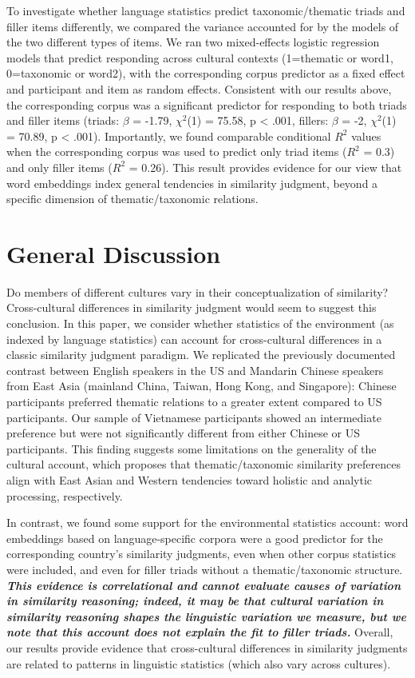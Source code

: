 \documentclass[10pt, letterpaper]{article}
\begin{document}
To investigate whether language statistics predict taxonomic/thematic
triads and filler items differently, we compared the variance accounted
for by the models of the two different types of items. We ran two
mixed-effects logistic regression models that predict responding across
cultural contexts (1=thematic or word1, 0=taxonomic or word2), with the
corresponding corpus predictor as a fixed effect and participant and
item as random effects. Consistent with our results above, the
corresponding corpus was a significant predictor for responding to both
triads and filler items (triads: \(\beta\) = -1.79, \(\chi^2\)(1) =
75.58, p \textless{} .001, fillers: \(\beta\) = -2, \(\chi^2\)(1) =
70.89, p \textless{} .001). Importantly, we found comparable conditional
\(R^2\) values when the corresponding corpus was used to predict only
triad items (\(R^2\) = 0.3) and only filler items (\(R^2\) = 0.26). This
result provides evidence for our view that word embeddings index general
tendencies in similarity judgment, beyond a specific dimension of
thematic/taxonomic relations.

\hypertarget{general-discussion}{%
\section{General Discussion}\label{general-discussion}}

Do members of different cultures vary in their conceptualization of
similarity? Cross-cultural differences in similarity judgment would seem
to suggest this conclusion. In this paper, we consider whether
statistics of the environment (as indexed by language statistics) can
account for cross-cultural differences in a classic similarity judgment
paradigm. We replicated the previously documented contrast between
English speakers in the US and Mandarin Chinese speakers from East Asia
(mainland China, Taiwan, Hong Kong, and Singapore): Chinese participants
preferred thematic relations to a greater extent compared to US
participants. Our sample of Vietnamese participants showed an
intermediate preference but were not significantly different from either
Chinese or US participants. This finding suggests some limitations on
the generality of the cultural account, which proposes that
thematic/taxonomic similarity preferences align with East Asian and
Western tendencies toward holistic and analytic processing,
respectively.

In contrast, we found some support for the environmental statistics
account: word embeddings based on language-specific corpora were a good
predictor for the corresponding country's similarity judgments, even
when other corpus statistics were included, and even for filler triads
without a thematic/taxonomic structure. \textbf{\emph{This evidence is
correlational and cannot evaluate causes of variation in similarity
reasoning; indeed, it may be that cultural variation in similarity
reasoning shapes the linguistic variation we measure, but we note that
this account does not explain the fit to filler triads.}} Overall, our
results provide evidence that cross-cultural differences in similarity
judgments are related to patterns in linguistic statistics (which also
vary across cultures).
\end{document}
